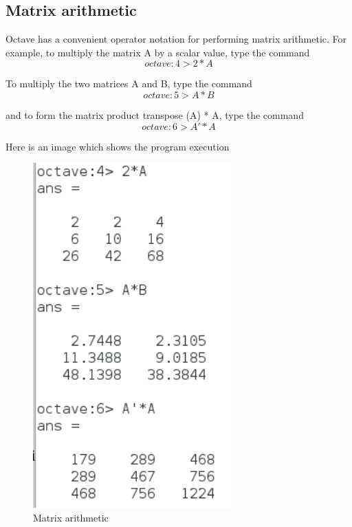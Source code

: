 \documentclass[a4paper,12pt]{article}
\begin{document}
\subsection{Matrix arithmetic}
\justifying
\par
Octave has a convenient operator notation for performing matrix arithmetic. For example, to multiply the matrix A by a scalar value, type the command
\begin{equation}
    \label{simple_equation}
	octave:4> 2 * A
\end{equation}
\par
To multiply the two matrices A and B, type the command
\begin{equation}
    \label{simple_equation}
	octave:5> A * B
\end{equation}
\par
and to form the matrix product transpose (A) * A, type the command
\begin{equation}
    \label{simple_equation}
	octave:6> A' * A
\end{equation}
\par
Here is an image which shows the program execution
\begin{figure}[H]
    \centering
    \includegraphics[width=3.0in]{img/3.png}
    \caption{Matrix arithmetic}
    \label{simulationfigure}
\end{figure}
\end{document}
